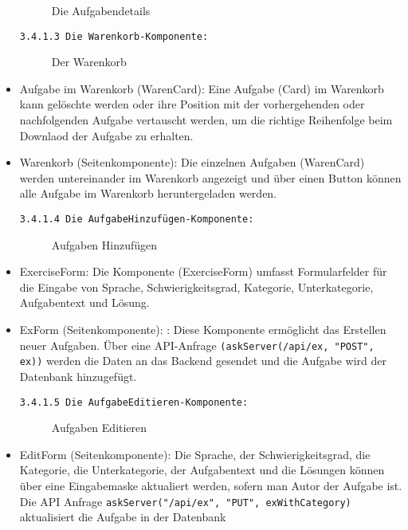 \begin{itemize}
\begin{figure}[ht]
  \caption{Die Aufgabendetails \cite{fig:aufgabendetails}}
\end{figure}

\texttt{3.4.1.3 Die Warenkorb-Komponente:}
\begin{figure}[ht]
  \caption{Der Warenkorb \cite{fig:warenkorb}}
\end{figure}

\item Aufgabe im Warenkorb (WarenCard):
Eine Aufgabe (Card) im Warenkorb kann gelöschte werden oder ihre Position mit der vorhergehenden oder nachfolgenden Aufgabe vertauscht werden, um die richtige Reihenfolge beim Downlaod der Aufgabe zu erhalten. 


\item Warenkorb (Seitenkomponente):
Die einzelnen Aufgaben (WarenCard) werden untereinander im Warenkorb angezeigt und über einen Button können alle Aufgabe im Warenkorb heruntergeladen werden.



\texttt{3.4.1.4 Die AufgabeHinzufügen-Komponente:}
\begin{figure}[ht]
  \caption{Aufgaben Hinzufügen \cite{fig:hinzufuegen}}
\end{figure}


\item{ExerciseForm}:
Die Komponente (ExerciseForm) umfasst Formularfelder für die Eingabe von Sprache, Schwierigkeitsgrad, Kategorie, Unterkategorie, Aufgabentext und Lösung.

\item ExForm (Seitenkomponente): :
Diese Komponente ermöglicht das Erstellen neuer Aufgaben. Über eine API-Anfrage \texttt{(askServer(/api/ex, "POST", ex))} werden die Daten an das Backend gesendet und die Aufgabe wird der Datenbank hinzugefügt.


\texttt{3.4.1.5 Die AufgabeEditieren-Komponente:}
\begin{figure}[ht]
  \caption{Aufgaben Editieren \cite{fig:editieren}}
\end{figure}

\item{EditForm} (Seitenkomponente):
Die Sprache, der Schwierigkeitsgrad, die Kategorie, die Unterkategorie, der Aufgabentext und die Lösungen können über eine Eingabemaske aktualiert werden, sofern man Autor der Aufgabe ist.
Die API Anfrage \texttt{askServer("/api/ex", "PUT", exWithCategory)} aktualisiert die Aufgabe in der Datenbank



\end{itemize}
